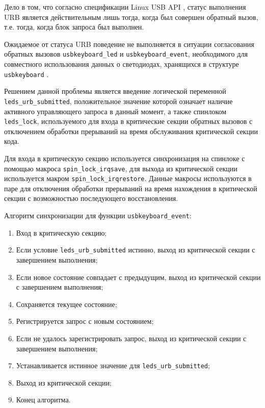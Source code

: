 Дело в том, что согласно спецификации Linux USB API \cite{usbapi},
статус выполнения URB является действительным лишь тогда,
когда был совершен обратный вызов, т.е. тогда, когда блок запроса
был выполнен.

Ожидаемое от статуса URB поведение не выполняется в ситуации
согласования обратных
вызовов \texttt{usbkeyboard\_led} и \texttt{usbkeyboard\_event},
необходимого для совместного использования данных о светодиодах,
хранящихся в структуре \texttt{usbkeyboard} \cite{verification}.

Решением данной проблемы является введение логической переменной
\texttt{leds\_urb\_submitted}, положительное значение которой означает
наличие активного управляющего запроса в данный момент,
а также спинлоком \texttt{leds\_lock}, используемого для входа
в критические секции обратных вызовов с отключением обработки
прерываний на время обслуживания критической секции кода.

Для входа в критическую секцию используется синхронизация
на спинлоке с помощью макроса \texttt{spin\_lock\_irqsave},
для выхода из критической секции используется макром \texttt{spin\_lock\_irqrestore}.
Данные макросы используются в паре для отключения обработки
прерываний на время нахождения в критической секции с возможностью последующего восстановления.

Алгоритм синхронизации для функции \texttt{usbkeyboard\_event}:
\begin{enumerate}
    \item Вход в критическую секцию;
    \item Если условие \texttt{leds\_urb\_submitted} истинно,
          выход из критической секции с завершением выполнения;
    \item Если новое состояние совпадает с предыдущим,
          выход из критической секции с завершением выполнения;
    \item Сохраняется текущее состояние;
    \item Регистрируется запрос с новым состоянием;
    \item Если не удалось зарегистрировать запрос,
          выход из критической секции с завершением выполнения;
    \item Устанавливается истинное значение для
          \texttt{leds\_urb\_submitted};
    \item Выход из критической секции;
    \item Конец алгоритма.
\end{enumerate}


